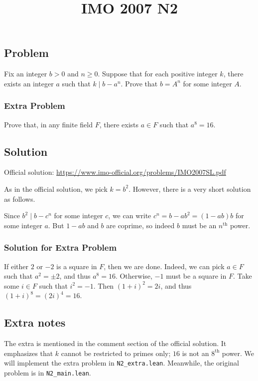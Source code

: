 \documentclass{article}
\title{IMO 2007 N2}
\author{}
\date{}
\begin{document}
\maketitle



\subsection*{Problem}

Fix an integer $b > 0$ and $n \geq 0$.
Suppose that for each positive integer $k$, there exists an integer $a$ such that $k \mid b - a^n$.
Prove that $b = A^n$ for some integer $A$.


\subsubsection*{Extra Problem}

Prove that, in any finite field $F$, there exists $a \in F$ such that $a^8 = 16$.



\subsection*{Solution}

Official solution: \url{https://www.imo-official.org/problems/IMO2007SL.pdf}

As in the official solution, we pick $k = b^2$.
However, there is a very short solution as follows.

Since $b^2 \mid b - c^n$ for some integer $c$, we can write $c^n = b - ab^2 = (1 - ab) b$ for some integer $a$.
But $1 - ab$ and $b$ are coprime, so indeed $b$ must be an $n^{\text{th}}$ power.



\subsubsection*{Solution for Extra Problem}

If either $2$ or $-2$ is a square in $F$, then we are done.
Indeed, we can pick $a \in F$ such that $a^2 = \pm 2$, and thus $a^8 = 16$.
Otherwise, $-1$ must be a square in $F$.
Take some $i \in F$ such that $i^2 = -1$.
Then $(1 + i)^2 = 2i$, and thus $(1 + i)^8 = (2i)^4 = 16$.



\subsection*{Extra notes}

The extra is mentioned in the comment section of the official solution.
It emphasizes that $k$ cannot be restricted to primes only; $16$ is not an $8^{\text{th}}$ power.
We will implement the extra problem in \texttt{N2\_extra.lean}.
Meanwhile, the original problem is in \texttt{N2\_main.lean}.
\end{document}
